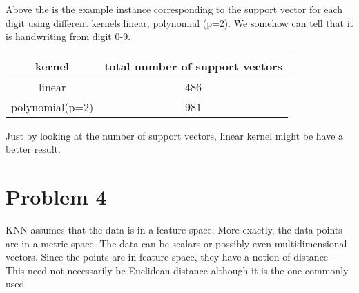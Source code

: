 \documentclass{article}
\begin{document}
 \begin{figure}[H]
 	\centering
 	
 	\caption{}
 	\label{fig:pattern1}
 \end{figure}
 Above the is the example instance corresponding to the support vector for each digit using different kernels:linear, polynomial (p=2). We somehow can tell that it is handwriting from digit 0-9. 
 
\begin{table}[H]
	\centering
	\begin{tabular}{|c|c|}
		\hline
		kernel&total number of support vectors\\
		\hline
		linear &486\\
		\hline
		polynomial(p=2)&981\\
		\hline
	\end{tabular}
\end{table}
Just by looking at the number of support vectors, linear kernel might be have a better result.
\section{Problem 4}
KNN assumes that the data is in a feature space. More exactly, the data points are in a metric space. The data can be scalars or possibly even multidimensional vectors. Since the points are in feature space, they have a notion of distance – This need not necessarily be Euclidean distance although it is the one commonly used.
\end{document}
